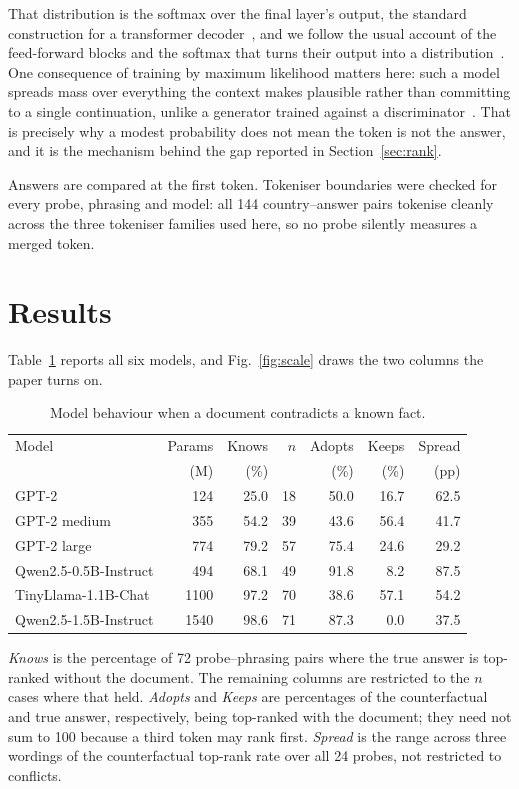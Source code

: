\documentclass[10pt,conference]{IEEEtran}
\begin{document}
That distribution is the softmax over the final layer's output, the standard construction for a transformer decoder~\cite{vaswani2017attention}, and we follow the usual account of the feed-forward blocks and the softmax that turns their output into a distribution~\cite{thakur2021fundamentals}. One consequence of training by maximum likelihood matters here: such a model spreads mass over everything the context makes plausible rather than committing to a single continuation, unlike a generator trained against a discriminator~\cite{thakur2021gan}. That is precisely why a modest probability does not mean the token is not the answer, and it is the mechanism behind the gap reported in Section~\ref{sec:rank}.

Answers are compared at the first token. Tokeniser boundaries were checked for every probe, phrasing and model: all 144 country--answer pairs tokenise cleanly across the three tokeniser families used here, so no probe silently measures a merged token.

\section{Results}
Table~\ref{tab:results} reports all six models, and Fig.~\ref{fig:scale} draws the two columns the paper turns on.

\begin{table}[t]
\caption{Model behaviour when a document contradicts a known fact.}
\label{tab:results}
\centering
\footnotesize
\setlength{\tabcolsep}{3pt}
\begin{tabular}{@{}lrrrrrr@{}}
\toprule
Model & Params & Knows & $n$ & Adopts & Keeps & Spread\\
 & (M) & (\%) & & (\%) & (\%) & (pp)\\
\midrule
GPT-2 & 124 & 25.0 & 18 & 50.0 & 16.7 & 62.5\\
GPT-2 medium & 355 & 54.2 & 39 & 43.6 & 56.4 & 41.7\\
GPT-2 large & 774 & 79.2 & 57 & 75.4 & 24.6 & 29.2\\
Qwen2.5-0.5B-Instruct & 494 & 68.1 & 49 & 91.8 & 8.2 & 87.5\\
TinyLlama-1.1B-Chat & 1100 & 97.2 & 70 & 38.6 & 57.1 & 54.2\\
Qwen2.5-1.5B-Instruct & 1540 & 98.6 & 71 & 87.3 & 0.0 & 37.5\\
\bottomrule
\end{tabular}
\par\smallskip
\parbox{\columnwidth}{\scriptsize
\emph{Knows} is the percentage of 72 probe--phrasing pairs where the true answer is top-ranked without the document. The remaining columns are restricted to the $n$ cases where that held. \emph{Adopts} and \emph{Keeps} are percentages of the counterfactual and true answer, respectively, being top-ranked with the document; they need not sum to 100 because a third token may rank first. \emph{Spread} is the range across three wordings of the counterfactual top-rank rate over all 24 probes, not restricted to conflicts.
}
\end{table}
\end{document}
